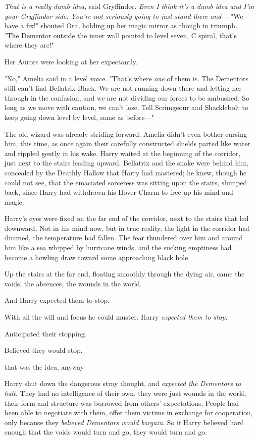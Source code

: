 {\el}

\emph{That is a really dumb idea,} said Gryffindor. \emph{Even I think it's a
dumb idea and I'm your Gryffindor side. You're not seriously going to just
stand there and---}
\sbreak
"We have a fix!" shouted Ora, holding up her magic mirror as though in triumph.
"The Dementor outside the inner wall pointed to level seven, C spiral, that's
where they are!"

Her Aurors were looking at her expectantly.

"No," Amelia said in a level voice. "That's where \emph{one} of them is. The
Dementors still can't find Bellatrix Black. We are not running down there and
letting her through in the confusion, and we are not dividing our forces to be
ambushed. So long as we move with caution, we can't lose. Tell Scrimgeour and
Shacklebolt to keep going down level by level, same as before\mbox{---}"

The old wizard was already striding forward. Amelia didn't even bother cursing
him, this time, as once again their carefully constructed shields parted like
water and rippled gently in his wake.
\sbreak
Harry waited at the beginning of the corridor, just next to the stairs leading
upward. Bellatrix and the snake were behind him, concealed by the Deathly
Hallow that Harry had mastered; he knew, though he could not see, that the
emaciated sorceress was sitting upon the stairs, slumped back, since Harry had
withdrawn his Hover Charm to free up his mind and magic.

Harry's eyes were fixed on the far end of the corridor, next to the stairs that
led downward. Not in his mind now, but in true reality, the light in the
corridor had dimmed, the temperature had fallen. The fear thundered over him
and around him like a sea whipped by hurricane winds, and the sucking emptiness
had become a howling draw toward some approaching black hole.

Up the stairs at the far end, floating smoothly through the dying air, came the
voids, the absences, the wounds in the world.

And Harry expected them to stop.

With all the will and focus he could muster, Harry \emph{expected them to stop.}

Anticipated their stopping.

Believed they would stop.

{\el} that was the idea, anyway{\el}

Harry shut down the dangerous stray thought, and \emph{expected the Dementors
to halt.} They had no intelligence of their own, they were just wounds in the
world, their form and structure was borrowed from others' expectations. People
had been able to negotiate with them, offer them victims in exchange for
cooperation, only because they \emph{believed Dementors would bargain.} So if
Harry believed hard enough that the voids would turn and go, they would turn
and go.

